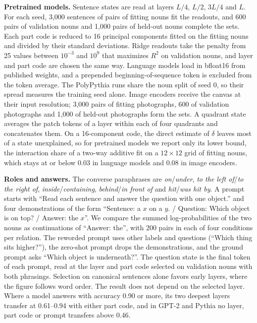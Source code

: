 \documentclass[10pt]{article}
\theoremstyle{plain}
\theoremstyle{remark}
\begin{document}
\textbf{Pretrained models.} Sentence states are read at layers $L/4$, $L/2$, $3L/4$ and $L$. For each seed, 3{,}000 sentences of pairs of fitting nouns fit the readouts, and 600 pairs of validation nouns and 1{,}000 pairs of held-out nouns complete the sets. Each part code is reduced to 16 principal components fitted on the fitting nouns and divided by their standard deviations. Ridge readouts take the penalty from 25 values between $10^{-3}$ and $10^{9}$ that maximizes $R^2$ on validation nouns, and layer and part code are chosen the same way. Language models load in bfloat16 from published weights, and a prepended beginning-of-sequence token is excluded from the token average. The PolyPythia runs share the noun split of seed 0, so their spread measures the training seed alone. Image encoders receive the canvas at their input resolution; 3{,}000 pairs of fitting photographs, 600 of validation photographs and 1{,}000 of held-out photographs form the sets. A quadrant state averages the patch tokens of a layer within each of four quadrants and concatenates them. On a 16-component code, the direct estimate of $\delta$ leaves most of a state unexplained, so for pretrained models we report only its lower bound, the interaction share of a two-way additive fit on a $12 \times 12$ grid of fitting nouns, which stays at or below 0.03 in language models and 0.08 in image encoders.

\textbf{Roles and answers.} The converse paraphrases are \emph{on}/\emph{under}, \emph{to the left of}/\emph{to the right of}, \emph{inside}/\emph{containing}, \emph{behind}/\emph{in front of} and \emph{hit}/\emph{was hit by}. A prompt starts with ``Read each sentence and answer the question with one object.'' and four demonstrations of the form ``Sentence: a $x$ on a $y$. / Question: Which object is on top? / Answer: the $x$''. We compare the summed log-probabilities of the two nouns as continuations of ``Answer: the'', with 200 pairs in each of four conditions per relation. The reworded prompt uses other labels and questions (``Which thing sits higher?''), the zero-shot prompt drops the demonstrations, and the ground prompt asks ``Which object is underneath?''. The question state is the final token of each prompt, read at the layer and part code selected on validation nouns with both phrasings. Selection on canonical sentences alone favors early layers, where the figure follows word order. The result does not depend on the selected layer. Where a model answers with accuracy 0.90 or more, its two deepest layers transfer at 0.61--0.94 with either part code, and in GPT-2 and Pythia no layer, part code or prompt transfers above 0.46.
\end{document}
